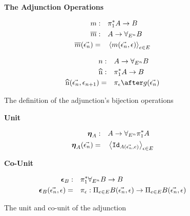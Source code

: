 \documentclass{Report}
\begin{document}
\begin{figure}
    \begin{framed}
        \centering
        \textbf{The Adjunction Operations}
        

        \begin{align}
            m:&\quad \pi_1^* A \rightarrow B\\
            \overline{m}:&\quad A\rightarrow \forall_{E^n} B\\
            \overline{m}(\vec{\epsilon_n}) =&\quad \left\langle m(\vec{\epsilon_n}, \epsilon)\right\rangle_{e\in E}
        \end{align}
        

        \begin{align}
            n:&\quad A \rightarrow \allEn B\\
            \widehat{n}:&\quad \pstar A\rightarrow B\\
            \widehat{n}(\env, \e_{n+1}) =&\quad\pi_\e\after g(\env)
        \end{align}
    \end{framed}

    \caption{The definition of the adjunction's bijection operations}
    \label{AdjunctionDefinition}
\end{figure}



\begin{figure}

    \begin{minipage}{0.45\textwidth}
    \begin{framed}
    \centering
    \textbf{Unit}
    
    \begin{align}
        \boldsymbol{\eta}_{A}:&\quad A \rightarrow \forall_{E^n}\pi_1^* A\\
        \boldsymbol{\eta}_{A}(\vec{\epsilon_n})=&\quad\left\langle\texttt{Id}_{A(\vec{\epsilon_n},e)}\right\rangle_{\epsilon\in E}
    \end{align}
    
    \end{framed}
\end{minipage}
\quad
\begin{minipage}{0.45\textwidth}
    \begin{framed}
        \centering
        \textbf{Co-Unit}
        
        \begin{align}
            \boldsymbol{\epsilon}_{B} : &\quad \pi_1^*\forall_{E^n} B \rightarrow B\\
            \boldsymbol{\epsilon}_{B}(\vec{\epsilon_n}, \epsilon) =&\quad \pi_\epsilon : \Pi_{e\in E}B(\vec{\epsilon_n}, \epsilon)\rightarrow \Pi_{e\in E}B(\vec{\epsilon_n}, \epsilon)
        \end{align}
        
            \end{framed}
\end{minipage}


    \caption{The unit and co-unit of the adjunction}
    \label{UnitCoUnitDefinition}
\end{figure}
\end{document}
